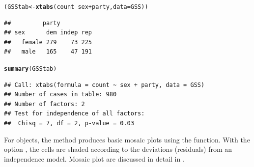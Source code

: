 \documentclass[11pt]{book}\usepackage[]{graphicx}\usepackage[]{color}
\makeatletter
\newcommand{\hlopt}[1]{\textcolor[rgb]{0,0,0}{#1}}%
\newcommand{\hlstd}[1]{\textcolor[rgb]{0.345,0.345,0.345}{#1}}%
\newcommand{\hlkwb}[1]{\textcolor[rgb]{0.69,0.353,0.396}{#1}}%
\newcommand{\hlkwc}[1]{\textcolor[rgb]{0.333,0.667,0.333}{#1}}%
\newcommand{\hlkwd}[1]{\textcolor[rgb]{0.737,0.353,0.396}{\textbf{#1}}}%
\newenvironment{kframe}{%
 \def\at@end@of@kframe{}%
 \ifinner\ifhmode%
  \def\at@end@of@kframe{\end{minipage}}%
  \begin{minipage}{\columnwidth}%
 \fi\fi%
 \def\FrameCommand##1{\hskip\@totalleftmargin \hskip-\fboxsep
 \colorbox{shadecolor}{##1}\hskip-\fboxsep
     \hskip-\linewidth \hskip-\@totalleftmargin \hskip\columnwidth}%
 \MakeFramed {\advance\hsize-\width
   \@totalleftmargin\z@ \linewidth\hsize
   \@setminipage}}%
 {\par\unskip\endMakeFramed%
 \at@end@of@kframe}
\newenvironment{knitrout}{}{} %
\renewenvironment{knitrout}{\small\renewcommand{\baselinestretch}{.85}}{} %
\makeatother
\begin{document}
\begin{knitrout}
\color{fgcolor}\begin{kframe}
\begin{alltt}
\hlstd{(GSStab} \hlkwb{<-} \hlkwd{xtabs}\hlstd{(count} \hlopt{~} \hlstd{sex} \hlopt{+} \hlstd{party,} \hlkwc{data}\hlstd{=GSS))}
\end{alltt}
\begin{verbatim}
##         party
## sex      dem indep rep
##   female 279    73 225
##   male   165    47 191
\end{verbatim}
\begin{alltt}
\hlkwd{summary}\hlstd{(GSStab)}
\end{alltt}
\begin{verbatim}
## Call: xtabs(formula = count ~ sex + party, data = GSS)
## Number of cases in table: 980 
## Number of factors: 2 
## Test for independence of all factors:
## 	Chisq = 7, df = 2, p-value = 0.03
\end{verbatim}
\end{kframe}
\end{knitrout}

For  objects, the  method produces basic mosaic plots
using the  function. With the option , the
cells are shaded according to the deviations (residuals) from an independence model.
Mosaic plot are discussed in detail in .
\end{document}
